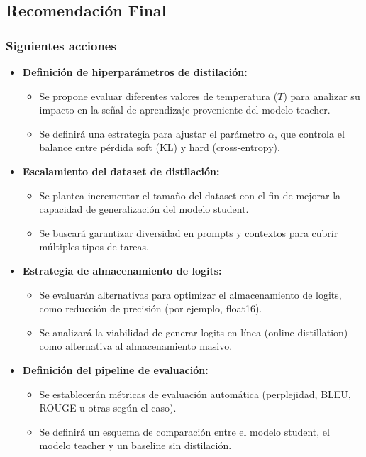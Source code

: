 \documentclass[12pt]{article}
\begin{document}
	\subsection{Recomendación Final}
	
	\subsubsection{Siguientes acciones}
	
	\begin{itemize}
		\item \textbf{Definición de hiperparámetros de distilación:}
		\begin{itemize}
			\item Se propone evaluar diferentes valores de temperatura ($T$) para analizar su impacto en la señal de aprendizaje proveniente del modelo teacher.
			\item Se definirá una estrategia para ajustar el parámetro $\alpha$, que controla el balance entre pérdida soft (KL) y hard (cross-entropy).
		\end{itemize}
		
		\item \textbf{Escalamiento del dataset de distilación:}
		\begin{itemize}
			\item Se plantea incrementar el tamaño del dataset con el fin de mejorar la capacidad de generalización del modelo student.
			\item Se buscará garantizar diversidad en prompts y contextos para cubrir múltiples tipos de tareas.
		\end{itemize}
		
		\item \textbf{Estrategia de almacenamiento de logits:}
		\begin{itemize}
			\item Se evaluarán alternativas para optimizar el almacenamiento de logits, como reducción de precisión (por ejemplo, float16).
			\item Se analizará la viabilidad de generar logits en línea (online distillation) como alternativa al almacenamiento masivo.
		\end{itemize}
		
		\item \textbf{Definición del pipeline de evaluación:}
		\begin{itemize}
			\item Se establecerán métricas de evaluación automática (perplejidad, BLEU, ROUGE u otras según el caso).
			\item Se definirá un esquema de comparación entre el modelo student, el modelo teacher y un baseline sin distilación.
		\end{itemize}
		

\end{itemize}
\end{document}
